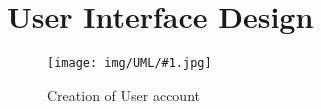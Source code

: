 \documentclass[../DD0.tex]{subfiles}
\begin{document}
\newcommand{\fetchUML}[4] {
  \begin{figure}[h!]
    \centering
    \hspace*{-#4cm}
    \texttt{[image: img/UML/\#1.jpg]}
    \caption{#2}
    \label{fig:#1}
  \end{figure}
}

\section {User Interface Design}
\label{sec:userdes}

    \fetchUML
      {User_Registration}
      {Creation of User account}
      {1}           %
      {0}           %

  \clearpage
\end{document}
